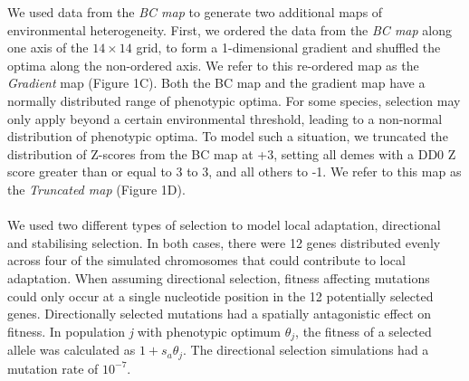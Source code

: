 \documentclass[11pt,twoside,lineno]{GSA_format}
\begin{document}
We used data from the \textit{BC map} to generate two additional maps of environmental heterogeneity. First, we ordered the data from the \textit{BC map} along one axis of the $14\times14$ grid, to form a 1-dimensional gradient and shuffled the optima along the non-ordered axis. We refer to this re-ordered map as the \textit{Gradient} map (Figure 1C). Both the BC map and the gradient map have a normally distributed range of phenotypic optima. For some species, selection may only apply beyond a certain environmental threshold, leading to a non-normal distribution of phenotypic optima. To model such a situation, we truncated the distribution of Z-scores from the BC map at +3, setting all demes with a DD0 Z score greater than or equal to 3 to 3, and all others to -1. We refer to this map as the \textit{Truncated map} (Figure 1D).\\
 \\




We used two different types of selection to model local adaptation, directional and stabilising selection. In both cases, there were 12 genes distributed evenly across four of the simulated chromosomes that could contribute to local adaptation. When assuming directional selection, fitness affecting mutations could only occur at a single nucleotide position in the 12 potentially selected genes. Directionally selected mutations had a spatially antagonistic effect on fitness. In population \textit{j} with phenotypic optimum $\theta_j$, the fitness of a selected allele was calculated as $1 + s_a\theta_j$. The directional selection simulations had a mutation rate of $10^{-7}$.  \\
\end{document}
